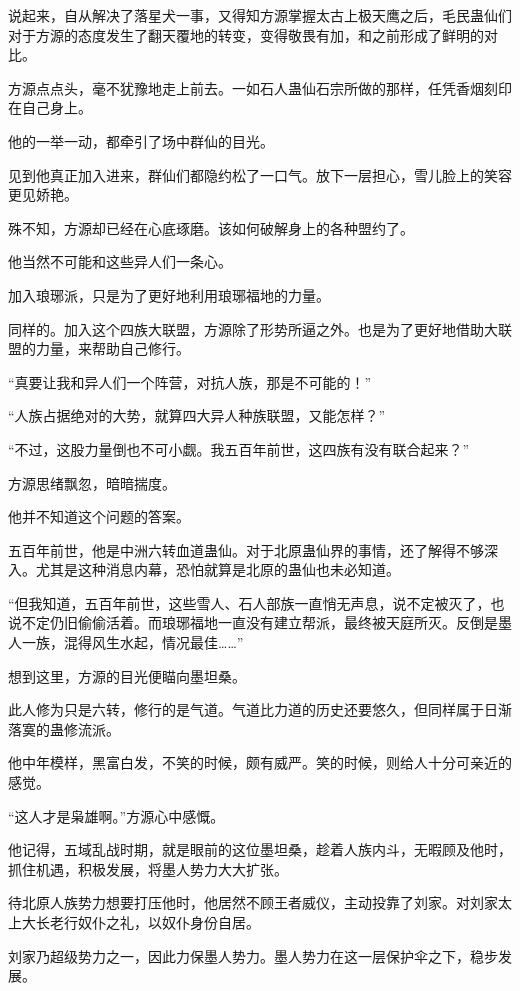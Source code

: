 \begin{this_body}
说起来，自从解决了落星犬一事，又得知方源掌握太古上极天鹰之后，毛民蛊仙们对于方源的态度发生了翻天覆地的转变，变得敬畏有加，和之前形成了鲜明的对比。

方源点点头，毫不犹豫地走上前去。一如石人蛊仙石宗所做的那样，任凭香烟刻印在自己身上。

他的一举一动，都牵引了场中群仙的目光。

见到他真正加入进来，群仙们都隐约松了一口气。放下一层担心，雪儿脸上的笑容更见娇艳。

殊不知，方源却已经在心底琢磨。该如何破解身上的各种盟约了。

他当然不可能和这些异人们一条心。

加入琅琊派，只是为了更好地利用琅琊福地的力量。

同样的。加入这个四族大联盟，方源除了形势所逼之外。也是为了更好地借助大联盟的力量，来帮助自己修行。

“真要让我和异人们一个阵营，对抗人族，那是不可能的！”

“人族占据绝对的大势，就算四大异人种族联盟，又能怎样？”

“不过，这股力量倒也不可小觑。我五百年前世，这四族有没有联合起来？”

方源思绪飘忽，暗暗揣度。

他并不知道这个问题的答案。

五百年前世，他是中洲六转血道蛊仙。对于北原蛊仙界的事情，还了解得不够深入。尤其是这种消息内幕，恐怕就算是北原的蛊仙也未必知道。

“但我知道，五百年前世，这些雪人、石人部族一直悄无声息，说不定被灭了，也说不定仍旧偷偷活着。而琅琊福地一直没有建立帮派，最终被天庭所灭。反倒是墨人一族，混得风生水起，情况最佳……”

想到这里，方源的目光便瞄向墨坦桑。

此人修为只是六转，修行的是气道。气道比力道的历史还要悠久，但同样属于日渐落寞的蛊修流派。

他中年模样，黑富白发，不笑的时候，颇有威严。笑的时候，则给人十分可亲近的感觉。

“这人才是枭雄啊。”方源心中感慨。

他记得，五域乱战时期，就是眼前的这位墨坦桑，趁着人族内斗，无暇顾及他时，抓住机遇，积极发展，将墨人势力大大扩张。

待北原人族势力想要打压他时，他居然不顾王者威仪，主动投靠了刘家。对刘家太上大长老行奴仆之礼，以奴仆身份自居。

刘家乃超级势力之一，因此力保墨人势力。墨人势力在这一层保护伞之下，稳步发展。


\end{this_body}
